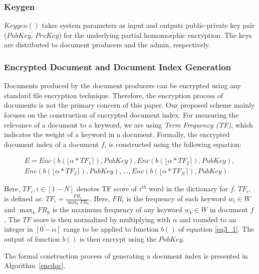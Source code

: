 \documentclass[sigconf,pdftex]{acmart}
\begin{document}
\subsubsection{\textbf{Keygen}}

    
$Keygen()$ takes system parameters as input and outputs public-private key pair ($PubKey$, $PrvKey$) for the underlying partial homomorphic encryption. The keys are distributed to document producers and the admin, respectively.




\subsubsection{\textbf{Encrypted Document and Document Index Generation}}\label{docindex}

Documents produced by the document producers can be encrypted using any standard file encryption technique. Therefore, the encryption process of documents is not the primary concern of this paper. Our proposed scheme mainly focuses on the construction of encrypted document index. For measuring the relevance of a document to a keyword, we are using \textit{Term Frequency (TF)}, which indicates the weight of a keyword in a document. Formally, the encrypted document index of a document $f$, is constructed using the following equation:

\begin{equation}
\begin{split}
    E=Enc(b(\lfloor \alpha * TF_{1} \rceil), PubKey), Enc(b(\lfloor \alpha * TF_{2} \rceil), PubKey),\\
    Enc(b(\lfloor \alpha * TF_{3} \rceil), PubKey),\dots, Enc(b(\lfloor \alpha * TF_{N} \rceil), PubKey)
\end{split}
 \end{equation}

Here, $TF_{i}, i \in [1-N]$ denotes TF score of $i^{th}$ word in the dictionary for $f$. ${TF_{i}}$, is defined as: $TF_{i} = \frac{FR_{i}}{\max_k FR_{k}}$. Here, $FR_{i}$ is the frequency of each keyword $w_i \in W$ and $\max_k FR_{k}$ is the maximum frequency of any keyword $w_k \in W$ in document $f$. The $TF$ score is then normalized by multiplying with $\alpha$ and rounded to an integer in $[0-\alpha]$ range to be applied to function $b()$ of equation \ref{eq3_1}. The output of function $b()$ is then encrypt using the $PubKey$.


 
The formal construction process of generating a document index is presented in Algorithm~\ref{encdoc}.
\end{document}
